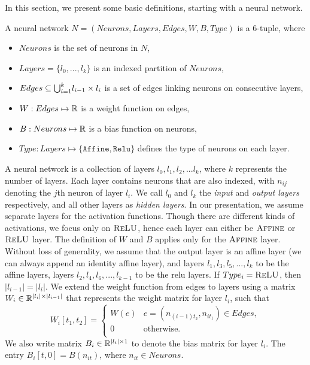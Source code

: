 In this section, we present some basic definitions, starting with a neural network. %

\begin{df}
  \label{def:net}
    A neural network $N = (Neurons, Layers, Edges, W, B, Type)$ is a 6-tuple, where
    \begin{itemize}
        \item $Neurons$ is the set of neurons in $N$,
        \item $Layers = \{l_0,...,l_k\}$ is an indexed partition of $Neurons$,
        \item $ Edges \subseteq {\bigcup}_{i=1}^{k} l_{i-1} \times l_{i}$ is a set of edges linking neurons on consecutive layers,
        \item $W : Edges \mapsto \mathbb{R}$ is a weight function on edges,
        \item $B : Neurons \mapsto \mathbb{R}$ is a bias function on neurons,
        \item $Type : Layers \mapsto \{\mathtt{Affine}, \mathtt{Relu}\}$ defines the type of neurons on each layer.
    \end{itemize}
\end{df}

A neural network is a collection of layers $l_0, l_1, l_2, ... l_k$, where $k$ represents the number of layers. Each layer contains neurons that are also indexed, with $n_{ij}$ denoting the $j$th neuron of layer $l_i$. We call $l_0$ and $l_k$ the {\em input} and {\em output layers} respectively, and all other layers as {\em hidden layers}. In our presentation, we assume separate layers for the activation functions. Though there are different kinds of activations, we focus only on $\textsc{ReLU}${}, hence each layer can either be  $\textsc{Affine}${} or $\textsc{ReLU}${} layer. The definition of $W$ and $B$ applies only for the $\textsc{Affine}${} layer. Without loss of generality, we assume that the output layer is an affine layer (we can always append an identity affine layer), and layers $l_1, l_3, l_5, ..., l_k$ to be the affine layers, layers $l_2, l_4, l_6, ..., l_{k-1}$ to be the relu layers. If $Type_i = \textsc{ReLU}$, then $|l_{i-1}| = |l_{i}|$. We extend the weight function from edges to layers using a matrix $W_i \in \mathbb{R}^{|l_i|\times|l_{i-1}|}$ that represents the weight matrix for layer $l_i$, such that
$$
W_i[t_1, t_2] = 
\begin{cases}
  W(e) & e=(n_{(i-1)t_2}, n_{it_1}) \in Edges,\\
  0 & \text{otherwise.}\\
\end{cases}
$$
We also write matrix $B_i \in \mathbb{R}^{|l_i|\times 1}$ to denote the bias matrix for layer $l_i$. The entry $B_i[t,0] = B(n_{it})$, where $n_{it} \in Neurons$. 

